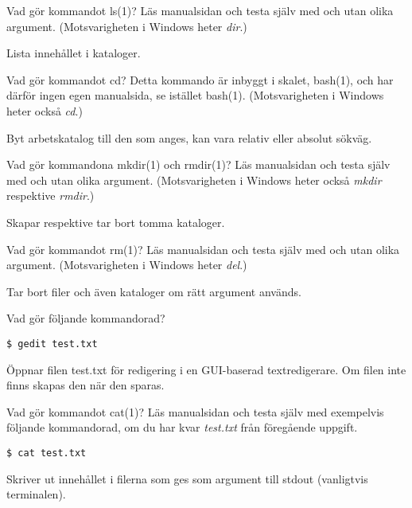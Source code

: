 \documentclass[11pt,a4paper]{miunasgn}
\begin{document}
\begin{questions}
	\question\label{q:ls}
	Vad gör kommandot ls(1)?
	Läs manualsidan och testa själv med och utan olika argument.
	(Motsvarigheten i Windows heter \emph{dir}.)
	\begin{solution}
		Lista innehållet i kataloger.
	\end{solution}

	\question\label{q:cd}
	Vad gör kommandot cd?
	Detta kommando är inbyggt i skalet, bash(1), och har därför ingen egen 
	manualsida, se istället bash(1).
	(Motsvarigheten i Windows heter också \emph{cd}.)
	\begin{solution}
		Byt arbetskatalog till den som anges, kan vara relativ eller absolut 
		sökväg.
	\end{solution}

	\question\label{q:mkdir}
	Vad gör kommandona mkdir(1) och rmdir(1)?
	Läs manualsidan och testa själv med och utan olika argument.
	(Motsvarigheten i Windows heter också \emph{mkdir} respektive \emph{rmdir}.)
	\begin{solution}
		Skapar respektive tar bort tomma kataloger.
	\end{solution}

	\question\label{q:rm}
	Vad gör kommandot rm(1)?
	Läs manualsidan och testa själv med och utan olika argument.
	(Motsvarigheten i Windows heter \emph{del}.)
	\begin{solution}
		Tar bort filer och även kataloger om rätt argument används.
	\end{solution}

	\question\label{q:gedit}
	Vad gör följande kommandorad?
	\begin{lstlisting}
$ gedit test.txt
	\end{lstlisting}
	\begin{solution}
		Öppnar filen test.txt för redigering i en GUI-baserad textredigerare.
		Om filen inte finns skapas den när den sparas.
	\end{solution}

	\question\label{q:cat}
	Vad gör kommandot cat(1)?
	Läs manualsidan och testa själv med exempelvis följande kommandorad, om du 
	har kvar \emph{test.txt} från föregående uppgift.
	\begin{lstlisting}
$ cat test.txt
	\end{lstlisting}
	\begin{solution}
		Skriver ut innehållet i filerna som ges som argument till stdout 
		(vanligtvis terminalen).
	\end{solution}


\end{questions}
\end{document}
